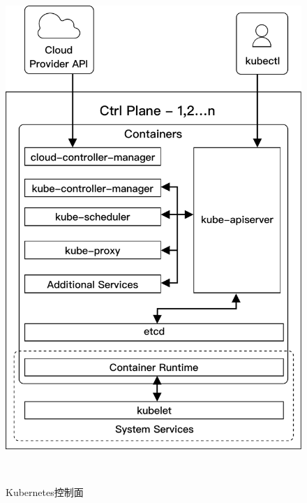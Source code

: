 \documentclass[macfonts,master]{njuthesis}
\begin{document}
\begin{figure}[h]
\begin{multicols}{2}
\includegraphics[width=\linewidth]{pics/K8s-ctrl-plane.pdf}\\
\caption{Kubernetes控制面\cite{gorillaguide}}\label{fig:k8s-ctrl}\par

\columnbreak

~\\[140pt]


\end{multicols}
\end{figure}
\end{document}

